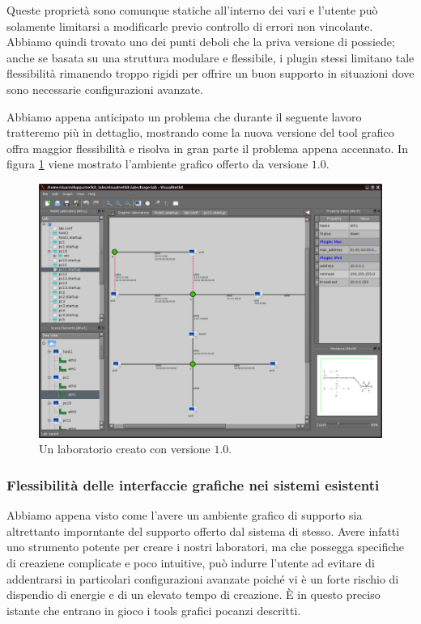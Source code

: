 Queste proprietà sono comunque statiche all'interno dei vari \plugin{} e l'utente può solamente limitarsi a modificarle previo controllo di errori non vincolante. Abbiamo quindi trovato uno dei punti deboli che la priva versione di \visualnetkit{} possiede; anche se basata su una struttura modulare e flessibile, i plugin stessi limitano tale flessibilità rimanendo troppo rigidi per offrire un buon supporto in situazioni dove sono necessarie configurazioni avanzate.

Abbiamo appena anticipato un problema che durante il seguente lavoro tratteremo più in dettaglio, mostrando come la nuova versione del tool grafico offra maggior flessibilità e risolva in gran parte il problema appena accennato. In figura \ref{figura:vn_main_1} viene mostrato l'ambiente grafico offerto da \visualnetkit{} versione $1.0$.

\begin{figure}[!ht]
	\centering
	\includegraphics[width=12cm]{images/visualnetkit_main_1.png}
	\caption{Un laboratorio creato con \visualnetkit{} versione $1.0$.}
	\label{figura:vn_main_1}
\end{figure}

\subsubsection{Flessibilità delle interfaccie grafiche nei sistemi esistenti}
Abbiamo appena visto come l'avere un ambiente grafico di supporto sia altrettanto imporntante del supporto offerto dal sistema di \emulazione{} stesso. Avere infatti uno strumento potente per creare i nostri laboratori, ma che possegga specifiche di creaziene complicate e poco intuitive, può indurre l'utente ad evitare di addentrarsi in particolari configurazioni avanzate poiché vi è un forte rischio di dispendio di energie e di un elevato tempo di creazione.
È in questo preciso istante che entrano in gioco i tools grafici pocanzi descritti.

